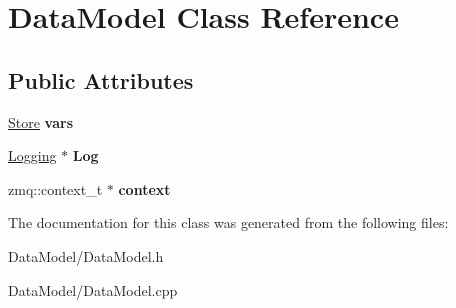 \hypertarget{classDataModel}{\section{Data\-Model Class Reference}
\label{classDataModel}
}
\subsection*{Public Attributes}
\begin{DoxyCompactItemize}
\item 
\hypertarget{classDataModel_a4baac5fe364a7a23762d70d2c2216486}{\hyperlink{classStore}{Store} {\bfseries vars}}\label{classDataModel_a4baac5fe364a7a23762d70d2c2216486}

\item 
\hypertarget{classDataModel_aa777da4c632e4659ee5b1447ad513458}{\hyperlink{classLogging}{Logging} $\ast$ {\bfseries Log}}\label{classDataModel_aa777da4c632e4659ee5b1447ad513458}

\item 
\hypertarget{classDataModel_a2c6dfd692e50f90e55338970ea7f8d61}{zmq\-::context\-\_\-t $\ast$ {\bfseries context}}\label{classDataModel_a2c6dfd692e50f90e55338970ea7f8d61}

\end{DoxyCompactItemize}


The documentation for this class was generated from the following files\-:\begin{DoxyCompactItemize}
\item 
Data\-Model/Data\-Model.\-h\item 
Data\-Model/Data\-Model.\-cpp\end{DoxyCompactItemize}

